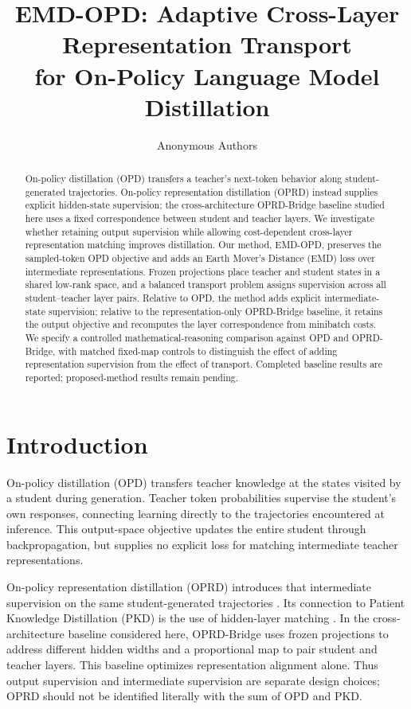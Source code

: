 \documentclass[10pt,twocolumn]{article}
\title{EMD-OPD: Adaptive Cross-Layer Representation Transport\\for On-Policy Language Model Distillation}
\author{Anonymous Authors}
\date{}
\newcommand{\method}{\textsc{EMD-OPD}}
\begin{document}
\maketitle

\begin{abstract}
On-policy distillation (OPD) transfers a teacher's next-token behavior along student-generated trajectories. On-policy representation distillation (OPRD) instead supplies explicit hidden-state supervision; the cross-architecture OPRD-Bridge baseline studied here uses a fixed correspondence between student and teacher layers. We investigate whether retaining output supervision while allowing cost-dependent cross-layer representation matching improves distillation. Our method, \method{}, preserves the sampled-token OPD objective and adds an Earth Mover's Distance (EMD) loss over intermediate representations. Frozen projections place teacher and student states in a shared low-rank space, and a balanced transport problem assigns supervision across all student--teacher layer pairs. Relative to OPD, the method adds explicit intermediate-state supervision; relative to the representation-only OPRD-Bridge baseline, it retains the output objective and recomputes the layer correspondence from minibatch costs. We specify a controlled mathematical-reasoning comparison against OPD and OPRD-Bridge, with matched fixed-map controls to distinguish the effect of adding representation supervision from the effect of transport. Completed baseline results are reported; proposed-method results remain pending.
\end{abstract}

\section{Introduction}

On-policy distillation (OPD) transfers teacher knowledge at the states visited by a student during generation. Teacher token probabilities supervise the student's own responses, connecting learning directly to the trajectories encountered at inference. This output-space objective updates the entire student through backpropagation, but supplies no explicit loss for matching intermediate teacher representations.

On-policy representation distillation (OPRD) introduces that intermediate supervision on the same student-generated trajectories \cite{yang2026oprd}. Its connection to Patient Knowledge Distillation (PKD) is the use of hidden-layer matching \cite{sun2019pkd}. In the cross-architecture baseline considered here, OPRD-Bridge uses frozen projections to address different hidden widths and a proportional map to pair student and teacher layers. This baseline optimizes representation alignment alone. Thus output supervision and intermediate supervision are separate design choices; OPRD should not be identified literally with the sum of OPD and PKD.
\end{document}
